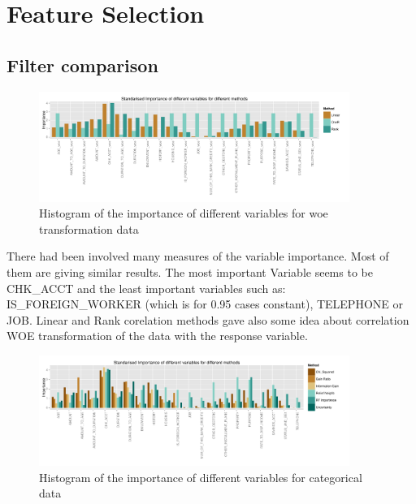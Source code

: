 \documentclass[10pt]{article}\usepackage[]{graphicx}\usepackage[]{color}
\begin{document}
\clearpage
\section{Feature Selection}


\subsection{Filter comparison}
\begin{figure}[h!]
  \centering
  \includegraphics[width=0.9\textwidth]{Plots/Rplot03}
  \caption[Close up of \textit{Hemidactylus} sp.]
   {Histogram of the importance of different variables for woe transformation data}
\end{figure}

There had been involved many measures of the variable importance. Most of them
are giving similar results. The most important Variable seems to be CHK\_ACCT and the least important variables such as: IS\_FOREIGN\_WORKER (which is for 0.95 cases constant), TELEPHONE or JOB. Linear and Rank corelation methods gave also some idea about correlation WOE transformation of the data with the response variable.

\begin{figure}[h!]
  \centering
  \includegraphics[width=0.9\textwidth]{Plots/Rplot04}
  \caption[Close up of \textit{Hemidactylus} sp.]
   {Histogram of the importance of different variables for categorical data}
\end{figure}
\end{document}
